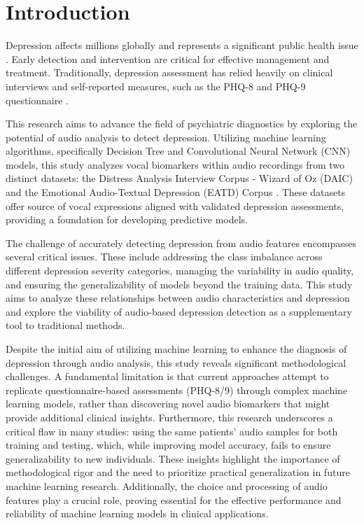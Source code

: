 \section{Introduction}

Depression affects millions globally and represents a significant public health issue \cite{WHO_Mental_Disorders_2019}. Early detection and intervention are critical for effective management and treatment. Traditionally, depression assessment has relied heavily on clinical interviews and self-reported measures, such as the PHQ-8 \cite{phq8} and PHQ-9 questionnaire \cite{kroenke2001phq}. 

This research aims to advance the field of psychiatric diagnostics by exploring the potential of audio analysis to detect depression. Utilizing machine learning algorithms, specifically Decision Tree and Convolutional Neural Network (CNN) models, this study analyzes vocal biomarkers within audio recordings from two distinct datasets: the Distress Analysis Interview Corpus - Wizard of Oz (DAIC) \cite{DAICWOZ} and the Emotional Audio-Textual Depression (EATD) Corpus \cite{shen2022automaticdepressiondetectionemotional}. These datasets offer source of vocal expressions aligned with validated depression assessments, providing a foundation for developing predictive models.

The challenge of accurately detecting depression from audio features encompasses several critical issues. These include addressing the class imbalance across different depression severity categories, managing the variability in audio quality, and ensuring the generalizability of models beyond the training data. This study aims to analyze these relationships between audio characteristics and depression and explore the viability of audio-based depression detection as a supplementary tool to traditional methods.

Despite the initial aim of utilizing machine learning to enhance the diagnosis of depression through audio analysis, this study reveals significant methodological challenges. A fundamental limitation is that current approaches attempt to replicate questionnaire-based assessments (PHQ-8/9) through complex machine learning models, rather than discovering novel audio biomarkers that might provide additional clinical insights. Furthermore, this research underscores a critical flaw in many studies: using the same patients' audio samples for both training and testing, which, while improving model accuracy, fails to ensure generalizability to new individuals. These insights highlight the importance of methodological rigor and the need to prioritize practical generalization in future machine learning research. Additionally, the choice and processing of audio features play a crucial role, proving essential for the effective performance and reliability of machine learning models in clinical applications.